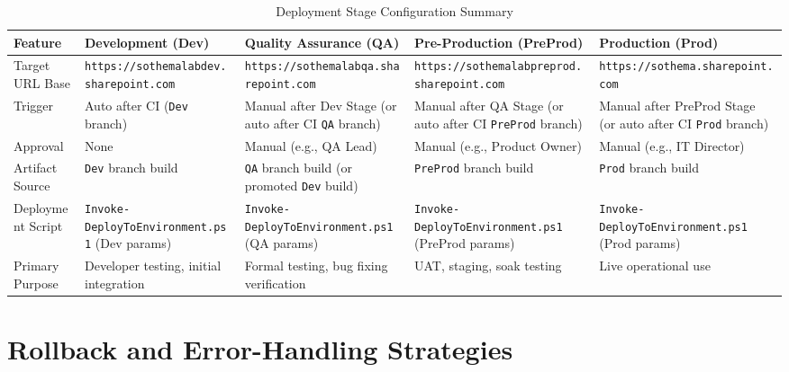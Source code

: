 \begin{table}[htbp]
    \centering
    \caption{Deployment Stage Configuration Summary}
    \label{tab:DeploymentStageConfigSummary}
    \begin{tabular}{|l|p{3.5cm}|p{3.5cm}|p{3.5cm}|p{3.5cm}|}
        \hline
        \textbf{Feature} & \textbf{Development (Dev)} & \textbf{Quality Assurance (QA)} & \textbf{Pre-Production (PreProd)} & \textbf{Production (Prod)} \\
        \hline
        Target URL Base & \texttt{https://sothemalabdev.sharepoint.com} & \texttt{https://sothemalabqa.sharepoint.com} & \texttt{https://sothemalabpreprod.sharepoint.com} & \texttt{https://sothema.sharepoint.com} \\
        \hline
        Trigger & Auto after CI (\texttt{Dev} branch) & Manual after Dev Stage (or auto after CI \texttt{QA} branch) & Manual after QA Stage (or auto after CI \texttt{PreProd} branch) & Manual after PreProd Stage (or auto after CI \texttt{Prod} branch) \\
        \hline
        Approval & None & Manual (e.g., QA Lead) & Manual (e.g., Product Owner) & Manual (e.g., IT Director) \\
        \hline
        Artifact Source & \texttt{Dev} branch build & \texttt{QA} branch build (or promoted \texttt{Dev} build) & \texttt{PreProd} branch build & \texttt{Prod} branch build \\
        \hline
        Deployment Script & \texttt{Invoke-DeployToEnvironment.ps1} (Dev params) & \texttt{Invoke-DeployToEnvironment.ps1} (QA params) & \texttt{Invoke-DeployToEnvironment.ps1} (PreProd params) & \texttt{Invoke-DeployToEnvironment.ps1} (Prod params) \\
        \hline
        Primary Purpose & Developer testing, initial integration & Formal testing, bug fixing verification & UAT, staging, soak testing & Live operational use \\
        \hline
    \end{tabular}
\end{table}

\section{Rollback and Error-Handling Strategies}
\label{sec:RollbackErrorHandling}

